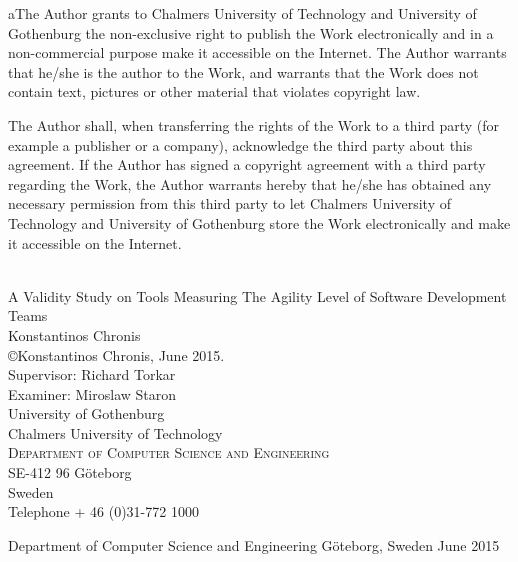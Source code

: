 \begin{author}
aThe Author grants to Chalmers University of Technology and University of Gothenburg  the non-exclusive right to publish the Work electronically and in a non-commercial purpose make it accessible on the Internet. 
The Author warrants that he/she is the author to the Work, and warrants that the Work does not contain text, pictures or other material that violates copyright law. 

The Author shall, when transferring the rights of the Work to a third party (for example a publisher or a company), acknowledge the third party about this agreement. If the Author has signed a copyright agreement with a third party regarding the Work, the Author warrants hereby that he/she has obtained any necessary permission from this third party to let Chalmers University of Technology and University of Gothenburg  store the Work electronically and make it accessible on the Internet. 
  
  \begin{flushleft}
    { \\[0.5cm] {\Large A Validity Study on Tools Measuring The Agility Level of Software Development Teams}} \\[0.5cm]
  
    Konstantinos Chronis \\[.2cm]
  
    {\copyright Konstantinos Chronis, June 2015.}\\[.2cm]
    
    Supervisor: Richard Torkar \\[.2cm] 
    Examiner: Miroslaw Staron \\[.5cm]
          
    {\Large University of Gothenburg  \\
    		Chalmers University of Technology  \\
      \textsc{Department of Computer Science and Engineering} \\
      SE-412 96 Göteborg \\
      Sweden \\
      Telephone + 46 (0)31-772 1000 \\
    } 
    
    Department of Computer Science and Engineering
	Göteborg, Sweden June 2015
	
  \end{flushleft} 
\end{author}

